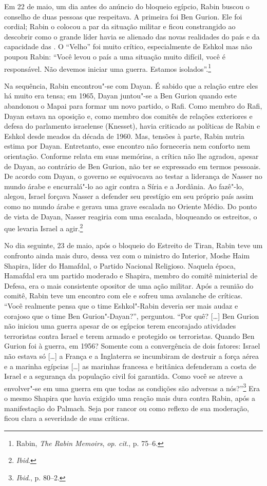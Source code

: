 Em 22 de maio, um dia antes do anúncio do bloqueio egípcio, Rabin buscou
o conselho de duas pessoas que respeitava. A primeira foi Ben Gurion.
Ele foi cordial; Rabin o colocou a par da situação militar e ficou
constrangido ao descobrir como o grande líder havia se alienado das
novas realidades do país e da capacidade das . O ``Velho'' foi muito
crítico, especialmente de Eshkol mas não poupou Rabin: ``Você levou o
país a uma situação muito difícil, você é responsável. Não devemos
iniciar uma guerra. Estamos isolados''.\footnote{Rabin, \emph{The Rabin Memoirs},
\emph{op}. \emph{cit}., p. 75--6.}

Na sequência, Rabin encontrou"-se com Dayan. É sabido que a relação entre eles
há muito era tensa; em 1965, Dayan juntou"-se a Ben Gurion quando
este abandonou o Mapai para formar um novo partido, o Rafi. Como membro
do Rafi, Dayan estava na oposição e, como membro dos comitês de relações
exteriores e defesa do parlamento israelense (Knesset), havia criticado as políticas de Rabin e
Eshkol desde meados da década de 1960. Mas, tensões à parte, Rabin
nutria estima por Dayan. Entretanto, esse encontro não forneceria nem
conforto nem orientação. Conforme relata em suas memórias, a crítica não
lhe agradou, apesar de Dayan, ao contrário de Ben Gurion, não ter se
expressado em termos pessoais. De acordo com Dayan, o governo se
equivocava ao testar a liderança de Nasser no mundo árabe e encurralá"-lo
ao agir contra a Síria e a Jordânia. Ao fazê"-lo, alegou, Israel forçava
Nasser a defender seu prestígio em seu próprio país assim como no mundo
árabe e gerava uma grave escalada no Oriente Médio. Do ponto de vista de
Dayan, Nasser reagiria com uma escalada, bloqueando os estreitos, o que
levaria Israel a agir.\footnote{\emph{Ibid}.}

No dia seguinte, 23 de maio, após o bloqueio do Estreito de Tiran, Rabin teve
um confronto ainda mais duro, dessa vez com o ministro do Interior,
Moshe Haim Shapira, líder do Hamafdal, o Partido Nacional Religioso.
Naquela época, Hamafdal era um partido
moderado e Shapira, membro do comitê ministerial de Defesa, era o mais
consistente opositor de uma ação militar. Após a reunião do comitê, Rabin
teve um encontro com ele e sofreu uma avalanche de críticas. ``Você
realmente pensa que o time Eshkol"-Rabin deveria ser mais audaz e
corajoso que o time Ben Gurion"-Dayan?'', perguntou. ``Por quê? {[}\ldots{}{]} Ben
Gurion não iniciou uma guerra apesar de os egípcios terem encorajado
atividades terroristas contra Israel e terem armado e protegido os
terroristas. Quando Ben Gurion foi à guerra, em 1956? Somente com a
convergência de dois fatores: Israel não estava só {[}\ldots{}{]} a França e a
Inglaterra se incumbiram de destruir a força aérea e a marinha
egípcias {[}\ldots{}{]} as marinhas francesa e britânica defenderam a costa de Israel
e a segurança da população civil foi garantida. Como você se atreve a
envolver"-se em uma guerra em que todas as condições são adversas a
nós?''\footnote{\emph{Ibid}., p. 80--2.} Era o mesmo Shapira que havia exigido uma reação mais
dura contra Rabin, após a manifestação do Palmach. Seja por rancor ou
como reflexo de sua moderação, ficou clara a severidade de suas
críticas.

